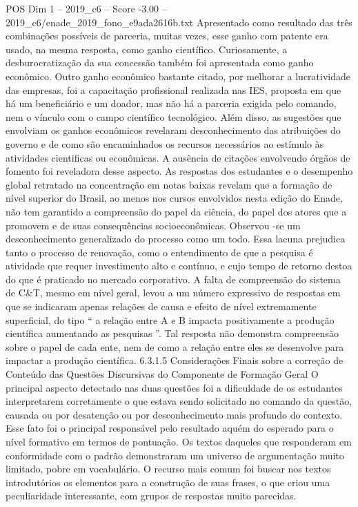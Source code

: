 \begin{textsample}{POS Dim 1 – 2019\_c6 – Score -3.00 – 2019\_c6/enade\_2019\_fono\_e9ada2616b.txt}
Apresentado como resultado das três combinações possíveis de parceria, muitas vezes, esse ganho com patente era usado, na mesma resposta, como ganho científico.
Curiosamente, a desburocratização da sua concessão também foi apresentada como ganho econômico.
Outro ganho econômico bastante citado, por melhorar a lucratividade das empresas, foi a capacitação profissional realizada nas IES, proposta em que há um beneficiário e um doador, mas não há a parceria exigida pelo comando, nem o vínculo com o campo científico tecnológico.
Além disso, as sugestões que envolviam os ganhos econômicos revelaram desconhecimento das atribuições do governo e de como são encaminhados os recursos necessários ao estímulo às atividades cientificas ou econômicas.
A ausência de citações envolvendo órgãos de fomento foi reveladora desse aspecto.
As respostas dos estudantes e o desempenho global retratado na concentração em notas baixas revelam que a formação de nível superior do Brasil, ao menos nos cursos envolvidos nesta edição do Enade, não tem garantido a compreensão do papel da ciência, do papel dos atores que a promovem e de suas consequências socioeconômicas.
Observou -se um desconhecimento generalizado do processo como um todo.
Essa lacuna prejudica tanto o processo de renovação, como o entendimento de que a pesquisa é atividade que requer investimento alto e contínuo, e cujo tempo de retorno destoa do que é praticado no mercado corporativo.
A falta de compreensão do sistema de C\&T, mesmo em nível geral, levou a um número expressivo de respostas em que se indicaram apenas relações de causa e efeito de nível extremamente superficial, do tipo “ a relação entre A e B impacta positivamente a produção científica aumentando as pesquisas ”.
Tal resposta não demonstra compreensão sobre o papel de cada ente, nem de como a relação entre eles se desenvolve para impactar a produção científica. 6.3.1.5 Considerações Finais sobre a correção de Conteúdo das Questões Discursivas do Componente de Formação Geral O principal aspecto detectado nas duas questões foi a dificuldade de os estudantes interpretarem corretamente o que estava sendo solicitado no comando da questão, causada ou por desatenção ou por desconhecimento mais profundo do contexto.
Esse fato foi o principal responsável pelo resultado aquém do esperado para o nível formativo em termos de pontuação.
Os textos daqueles que responderam em conformidade com o padrão demonstraram um universo de argumentação muito limitado, pobre em vocabulário.
O recurso mais comum foi buscar nos textos introdutórios os elementos para a construção de suas frases, o que criou uma peculiaridade interessante, com grupos de respostas muito parecidas.

\end{textsample}
